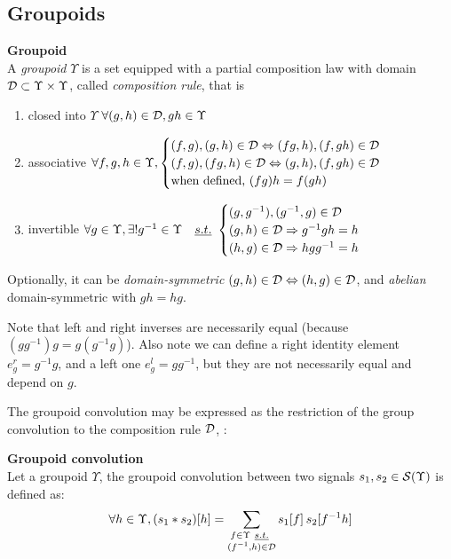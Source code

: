\subsection{Groupoids}

\begin{definition}\textbf{Groupoid}\\
A \emph{groupoid} $\Upsilon$ is a set equipped with a partial composition law with domain $\cd \subset \Upsilon \times \Upsilon$, called \emph{composition rule}, that is
\begin{enumerate}
	\item\label{enum:g1} closed into $\Upsilon$ \ie $\forall (g, h) \in \cd, gh \in \Upsilon$
	\item\label{enum:g2} associative \ie
    $\forall f,g,h \in \Upsilon,
      \begin{cases}
        (f, g), (g, h) \in \cd \Leftrightarrow (fg,h), (f, gh) \in \cd\\
        (f, g), (fg, h) \in \cd \Leftrightarrow (g,h), (f, gh) \in \cd\\
        \text{when defined, } (fg)h = f(gh)
      \end{cases}$ \label{enum:2}
	\item\label{enum:g3} invertible \ie
		$\forall g \in \Upsilon, \exists! g^{-1} \in \Upsilon \quad\st
			\begin{cases}
				(g,g^{-1}), (g^{-1},g)  \in \cd\\
				(g,h) \in \cd \Rightarrow g^{-1}gh = h\\
				(h,g) \in \cd \Rightarrow hgg^{-1} = h
			\end{cases}$
\end{enumerate}
Optionally, it can be \emph{domain-symmetric} \ie $(g,h) \in \cd \Leftrightarrow (h,g) \in \cd$, and \emph{abelian} \ie domain-symmetric with $gh = hg$.
\end{definition}

\begin{remark}
Note that left and right inverses are necessarily equal (because $(gg^{-1})g=g(g^{-1}g)$). Also note we can define a right identity element $e^r_g = g^{-1}g$, and a left one $e^l_g = gg^{-1}$, but they are not necessarily equal and depend on $g$.
\end{remark}

The groupoid convolution may be expressed as the restriction of the group convolution to the composition rule $\cd$, \ie:

\begin{definition}\textbf{Groupoid convolution}\\
Let a groupoid $\Upsilon$, the groupoid convolution between two signals $s_1,s_2 \in \cs(\Upsilon)$ is defined as:
\begin{gather*}
\forall h \in \Upsilon, (s_1 \ast s_2) [h] = \displaystyle\sum_{\substack{f \in \Upsilon ~\st\\ (f^{-1}, h) \in \cd}} s_1[f] \h{2} s_2[f^{-1}h]
\end{gather*}
\end{definition}

